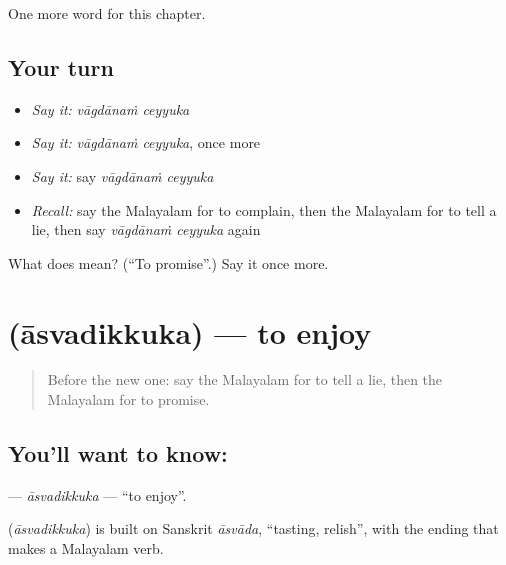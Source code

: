 \begin{grammarlens}[title={What you've built}]
One more word for this chapter.
\end{grammarlens}

\subsection*{Your turn}
\begin{itemize}
\raggedright
  \item \emph{Say it:} \emph{vāgdānaṁ ceyyuka}
  \item \emph{Say it:} \emph{vāgdānaṁ ceyyuka}, once more
  \item \emph{Say it:} say \emph{vāgdānaṁ ceyyuka}
  \item \emph{Recall:} say the Malayalam for to complain, then the Malayalam for to tell a lie, then say \emph{vāgdānaṁ ceyyuka} again
\end{itemize}

\begin{tcolorbox}[breakable,colback=teal!4,colframe=teal!35!black,title={Before you move on}]
What does   mean? (\textquotedblleft{}To promise\textquotedblright{}.) Say it once more.
\end{tcolorbox}
\section[\texorpdfstring{\ml{ആസ്വദിക്കുക} (āsvadikkuka)}{ആസ്വദിക്കുക (āsvadikkuka)}]{ (āsvadikkuka) — to enjoy}

\label{lesson:ML-C228-asvadikkuka}



\begin{quote}
Before the new one: say the Malayalam for to tell a lie, then the Malayalam for to promise.
\end{quote}

\subsection*{You'll want to know: }
\textbf{} — \emph{āsvadikkuka} — \textquotedblleft{}to enjoy\textquotedblright{}.

\begin{cousinweb}
\textbf{} (\emph{āsvadikkuka}) is built on Sanskrit \emph{āsvāda}, \textquotedblleft{}tasting, relish\textquotedblright{}, with the ending that makes a Malayalam verb.
\end{cousinweb}

